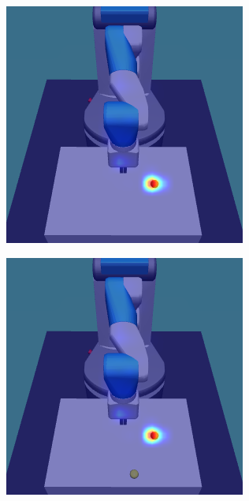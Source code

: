 \begin{figure}
\begin{subfigure}{0.24\columnwidth}
  \end{subfigure}
  \begin{subfigure}{0.24\columnwidth}
    \includegraphics[width=\linewidth]{figures/chapter6/distractor_saliency_fetch_pro_off/standard_visual_random}
  \end{subfigure}
  \begin{subfigure}{0.24\columnwidth}
    \includegraphics[width=\linewidth]{figures/chapter6/distractor_saliency_fetch_pro_off/color_visual_random}
  \end{subfigure}
  

\end{figure}
